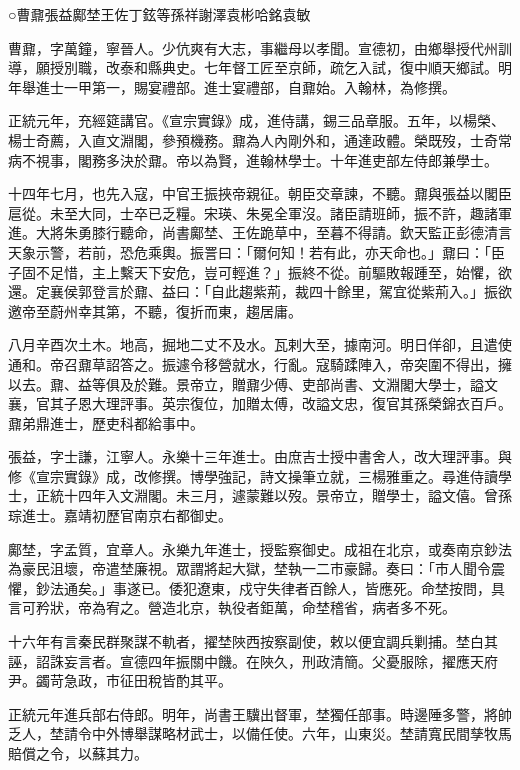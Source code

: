 
\begin{pinyinscope}
○曹鼐張益鄺埜王佐丁鉉等孫祥謝澤袁彬哈銘袁敏

曹鼐，字萬鐘，寧晉人。少伉爽有大志，事繼母以孝聞。宣德初，由鄉舉授代州訓導，願授別職，改泰和縣典史。七年督工匠至京師，疏乞入試，復中順天鄉試。明年舉進士一甲第一，賜宴禮部。進士宴禮部，自鼐始。入翰林，為修撰。

正統元年，充經筵講官。《宣宗實錄》成，進侍講，錫三品章服。五年，以楊榮、楊士奇薦，入直文淵閣，參預機務。鼐為人內剛外和，通達政體。榮既歿，士奇常病不視事，閣務多決於鼐。帝以為賢，進翰林學士。十年進吏部左侍郎兼學士。

十四年七月，也先入寇，中官王振挾帝親征。朝臣交章諫，不聽。鼐與張益以閣臣扈從。未至大同，士卒已乏糧。宋瑛、朱冕全軍沒。諸臣請班師，振不許，趣諸軍進。大將朱勇膝行聽命，尚書鄺埜、王佐跪草中，至暮不得請。欽天監正彭德清言天象示警，若前，恐危乘輿。振詈曰：「爾何知！若有此，亦天命也。」鼐曰：「臣子固不足惜，主上繫天下安危，豈可輕進？」振終不從。前驅敗報踵至，始懼，欲還。定襄侯郭登言於鼐、益曰：「自此趨紫荊，裁四十餘里，駕宜從紫荊入。」振欲邀帝至蔚州幸其第，不聽，復折而東，趨居庸。

八月辛酉次土木。地高，掘地二丈不及水。瓦剌大至，據南河。明日佯卻，且遣使通和。帝召鼐草詔答之。振遽令移營就水，行亂。寇騎蹂陣入，帝突圍不得出，擁以去。鼐、益等俱及於難。景帝立，贈鼐少傅、吏部尚書、文淵閣大學士，謚文襄，官其子恩大理評事。英宗復位，加贈太傅，改謚文忠，復官其孫榮錦衣百戶。鼐弟鼎進士，歷吏科都給事中。

張益，字士謙，江寧人。永樂十三年進士。由庶吉士授中書舍人，改大理評事。與修《宣宗實錄》成，改修撰。博學強記，詩文操筆立就，三楊雅重之。尋進侍讀學士，正統十四年入文淵閣。未三月，遽蒙難以歿。景帝立，贈學士，謚文僖。曾孫琮進士。嘉靖初歷官南京右都御史。

鄺埜，字孟質，宜章人。永樂九年進士，授監察御史。成祖在北京，或奏南京鈔法為豪民沮壞，帝遣埜廉視。眾謂將起大獄，埜執一二市豪歸。奏曰：「市人聞令震懼，鈔法通矣。」事遂已。倭犯遼東，戍守失律者百餘人，皆應死。命埜按問，具言可矜狀，帝為宥之。營造北京，執役者鉅萬，命埜稽省，病者多不死。

十六年有言秦民群聚謀不軌者，擢埜陜西按察副使，敕以便宜調兵剿捕。埜白其誣，詔誅妄言者。宣德四年振關中饑。在陜久，刑政清簡。父憂服除，擢應天府尹。蠲苛急政，市征田稅皆酌其平。

正統元年進兵部右侍郎。明年，尚書王驥出督軍，埜獨任部事。時邊陲多警，將帥乏人，埜請令中外博舉謀略材武士，以備任使。六年，山東災。埜請寬民間孳牧馬賠償之令，以蘇其力。


\end{pinyinscope}
